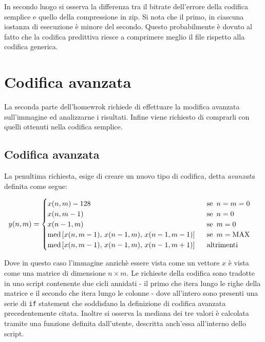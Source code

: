 In secondo luogo si osserva la differenza tra il bitrate dell'errore della codifica semplice e quello della compressione in zip. Si nota che il primo, in ciascuna iostanza di esecuzione è minore del secondo. Questo probabilmente è dovuto al fatto che la codifica predittiva riesce a comprimere meglio il file rispetto alla codifica generica. 





\newpage\section{Codifica avanzata}
La seconda parte dell'homewrok richiede di effettuare la modifica avanzata sull'immagine ed analizzarne i risultati. Infine viene richiesto di comprarli con quelli ottenuti nella codifica semplice.


\vspace{15px}\subsection{Codifica avanzata}

La penultima richiesta, esige di creare un nuovo tipo di codifica, detta \textsl{avanzata} definita come segue:

\begin{gather*}
    y(n, m) = 
    \begin{cases}
        x(n, m) - 128 \hspace{161px} \text{se } \, n = m = 0 \\
        x(n, m - 1) \hspace{171px} \text{se } \, n = 0\\
        x(n - 1, m) \hspace{171px} \text{se } \, m = 0\\
        \text{med}\left[ x(n, m - 1),\, x(n - 1, m),\, x(n - 1, m - 1) \right] \hspace{15px} \text{se } \, m = \text{MAX}\\
        \text{med}\left[ x(n, m - 1),\, x(n - 1, m),\, x(n - 1, m + 1) \right] \hspace{15px} \text{altrimenti}
    \end{cases}
\end{gather*} 

\noindent Dove in questo caso l'immagine anzichè essere vista come un vettore $x$ è vista come una matrice di dimensione $n \times m$. Le richieste della codifica sono tradotte in uno script contenente due cicli annidati - il primo che itera lungo le righe della matrice e il secondo che itera lungo le colonne - dove all'intero sono presenti una serie di \texttt{if} statement che soddisfano la definizione di codifica avanzata precedentemente citata. Inoltre si osserva la mediana dei tre valori è calcolata tramite una funzione definita dall'utente, descritta anch'essa all'interno dello script. 

